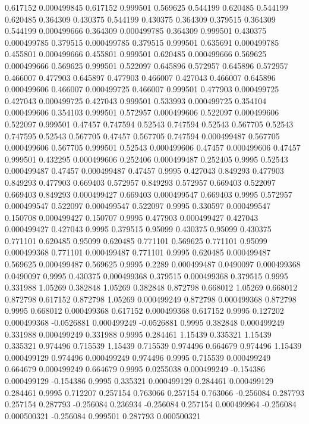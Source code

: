 0.617152 0.000499845
0.617152 0.999501
0.569625 0.544199
0.620485 0.544199
0.620485 0.364309
0.430375 0.544199
0.430375 0.364309
0.379515 0.364309
0.544199 0.000499666
0.364309 0.000499785
0.364309 0.999501
0.430375 0.000499785
0.379515 0.000499785
0.379515 0.999501
0.635691 0.000499785
0.455801 0.000499666
0.455801 0.999501
0.620485 0.000499666
0.569625 0.000499666
0.569625 0.999501
0.522097 0.645896
0.572957 0.645896
0.572957 0.466007
0.477903 0.645897
0.477903 0.466007
0.427043 0.466007
0.645896 0.000499606
0.466007 0.000499725
0.466007 0.999501
0.477903 0.000499725
0.427043 0.000499725
0.427043 0.999501
0.533993 0.000499725
0.354104 0.000499606
0.354103 0.999501
0.572957 0.000499606
0.522097 0.000499606
0.522097 0.999501
0.47457 0.747594
0.52543 0.747594
0.52543 0.567705
0.52543 0.747595
0.52543 0.567705
0.47457 0.567705
0.747594 0.000499487
0.567705 0.000499606
0.567705 0.999501
0.52543 0.000499606
0.47457 0.000499606
0.47457 0.999501
0.432295 0.000499606
0.252406 0.000499487
0.252405 0.9995
0.52543 0.000499487
0.47457 0.000499487
0.47457 0.9995
0.427043 0.849293
0.477903 0.849293
0.477903 0.669403
0.572957 0.849293
0.572957 0.669403
0.522097 0.669403
0.849293 0.000499427
0.669403 0.000499547
0.669403 0.9995
0.572957 0.000499547
0.522097 0.000499547
0.522097 0.9995
0.330597 0.000499547
0.150708 0.000499427
0.150707 0.9995
0.477903 0.000499427
0.427043 0.000499427
0.427043 0.9995
0.379515 0.95099
0.430375 0.95099
0.430375 0.771101
0.620485 0.95099
0.620485 0.771101
0.569625 0.771101
0.95099 0.000499368
0.771101 0.000499487
0.771101 0.9995
0.620485 0.000499487
0.569625 0.000499487
0.569625 0.9995
0.2289 0.000499487
0.0490097 0.000499368
0.0490097 0.9995
0.430375 0.000499368
0.379515 0.000499368
0.379515 0.9995
0.331988 1.05269
0.382848 1.05269
0.382848 0.872798
0.668012 1.05269
0.668012 0.872798
0.617152 0.872798
1.05269 0.000499249
0.872798 0.000499368
0.872798 0.9995
0.668012 0.000499368
0.617152 0.000499368
0.617152 0.9995
0.127202 0.000499368
-0.0526881 0.000499249
-0.0526881 0.9995
0.382848 0.000499249
0.331988 0.000499249
0.331988 0.9995
0.284461 1.15439
0.335321 1.15439
0.335321 0.974496
0.715539 1.15439
0.715539 0.974496
0.664679 0.974496
1.15439 0.000499129
0.974496 0.000499249
0.974496 0.9995
0.715539 0.000499249
0.664679 0.000499249
0.664679 0.9995
0.0255038 0.000499249
-0.154386 0.000499129
-0.154386 0.9995
0.335321 0.000499129
0.284461 0.000499129
0.284461 0.9995
0.712207 0.257154
0.763066 0.257154
0.763066 -0.256084
0.287793 0.257154
0.287793 -0.256084
0.236934 -0.256084
0.257154 0.000499964
-0.256084 0.000500321
-0.256084 0.999501
0.287793 0.000500321
